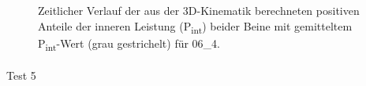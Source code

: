 \documentclass[
  letterpaper,
  DIV=11]{scrartcl}
\makeatletter
\let\oldparagraph\paragraph
\renewcommand{\paragraph}{
    \@ifstar
      \xxxParagraphStar
      \xxxParagraphNoStar
  }
\newcommand{\xxxParagraphStar}[1]{\oldparagraph*{#1}\mbox{}}
\newcommand{\xxxParagraphNoStar}[1]{\oldparagraph{#1}\mbox{}}
\makeatother
\begin{document}
\begin{figure}


\caption{\label{fig-PInt_Kinematik_06_4}Zeitlicher Verlauf der aus der
3D-Kinematik berechneten positiven Anteile der inneren Leistung
(P\textsubscript{int}) beider Beine mit gemitteltem
P\textsubscript{int}-Wert (grau gestrichelt) für 06\_4.}

\end{figure}%

\paragraph{Test 5}
\end{document}
